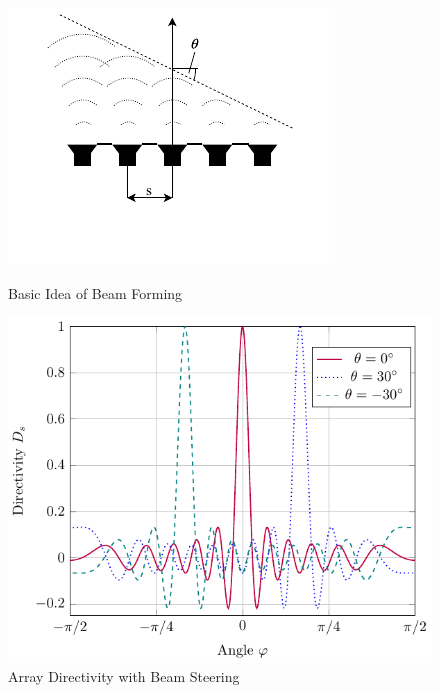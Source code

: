 \begin{figure}
    \begin{minipage}{0.49\textwidth}
        \centering
        \includegraphics[trim=0mm 7mm 0mm 0mm,width=\textwidth]{images/3_Parametric_array/Beamforming.pdf}
        \caption{Basic Idea of Beam Forming}
        \label{3_fig:basic_idea_beamforming}
    \end{minipage}
    \begin{minipage}{0.49\textwidth}
        \centering
        \includegraphics[width=\textwidth]{images/3_Parametric_array/Directivity_Steer.pdf}
        \caption{Array Directivity with Beam Steering}
         \label{3_fig:directivity_beamsteering}
    \end{minipage}
\end{figure}
\newpage

